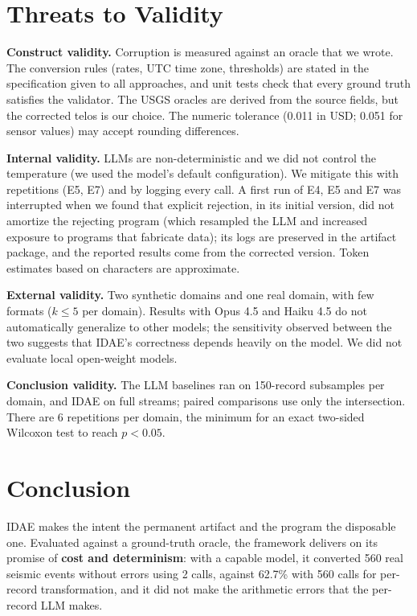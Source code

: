 \documentclass[sigconf,nonacm]{acmart}
\begin{document}
\section{Threats to Validity}

\textbf{Construct validity.} Corruption is measured against an oracle that we wrote. The conversion rules (rates, UTC time zone, thresholds) are stated in the specification given to all approaches, and unit tests check that every ground truth satisfies the validator. The USGS oracles are derived from the source fields, but the corrected telos is our choice. The numeric tolerance (0.011 in USD; 0.051 for sensor values) may accept rounding differences.

\textbf{Internal validity.} LLMs are non-deterministic and we did not control the temperature (we used the model's default configuration). We mitigate this with repetitions (E5, E7) and by logging every call. A first run of E4, E5 and E7 was interrupted when we found that explicit rejection, in its initial version, did not amortize the rejecting program (which resampled the LLM and increased exposure to programs that fabricate data); its logs are preserved in the artifact package, and the reported results come from the corrected version. Token estimates based on characters are approximate.

\textbf{External validity.} Two synthetic domains and one real domain, with few formats ($k \le 5$ per domain). Results with Opus 4.5 and Haiku 4.5 do not automatically generalize to other models; the sensitivity observed between the two suggests that IDAE's correctness depends heavily on the model. We did not evaluate local open-weight models.

\textbf{Conclusion validity.} The LLM baselines ran on 150-record subsamples per domain, and IDAE on full streams; paired comparisons use only the intersection. There are 6 repetitions per domain, the minimum for an exact two-sided Wilcoxon test to reach $p < 0.05$.

\section{Conclusion}

IDAE makes the intent the permanent artifact and the program the disposable one. Evaluated against a ground-truth oracle, the framework delivers on its promise of \textbf{cost and determinism}: with a capable model, it converted 560 real seismic events without errors using 2 calls, against 62.7\% with 560 calls for per-record transformation, and it did not make the arithmetic errors that the per-record LLM makes.
\end{document}
